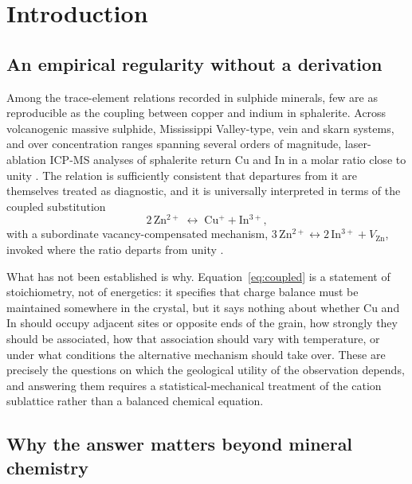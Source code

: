 \documentclass[11pt,a4paper]{article}
\begin{document}
\section{Introduction}

\subsection{An empirical regularity without a derivation}

Among the trace-element relations recorded in sulphide minerals, few are as
reproducible as the coupling between copper and indium in sphalerite. Across
volcanogenic massive sulphide, Mississippi Valley-type, vein and skarn systems,
and over concentration ranges spanning several orders of magnitude,
laser-ablation ICP-MS analyses of sphalerite return Cu and In in a molar ratio
close to unity \citep{cook2009,frenzel2016}. The relation is sufficiently
consistent that
departures from it are themselves treated as diagnostic, and it is universally
interpreted in terms of the coupled substitution
\begin{equation}
2\,\mathrm{Zn^{2+}} \;\longleftrightarrow\; \mathrm{Cu^{+}} + \mathrm{In^{3+}},
\label{eq:coupled}
\end{equation}
with a subordinate vacancy-compensated mechanism,
$3\,\mathrm{Zn^{2+}} \leftrightarrow 2\,\mathrm{In^{3+}} + V_{\mathrm{Zn}}$,
invoked where the ratio departs from unity
\citep{johan1988,belissont2014}.

What has not been established is why. Equation~\eqref{eq:coupled} is a statement
of stoichiometry, not of energetics: it specifies that charge balance must be
maintained somewhere in the crystal, but it says nothing about whether Cu and In
should occupy adjacent sites or opposite ends of the grain, how strongly they
should be associated, how that association should vary with temperature, or
under what conditions the alternative mechanism should take over. These are
precisely the questions on which the geological utility of the observation
depends, and answering them requires a statistical-mechanical treatment of the
cation sublattice rather than a balanced chemical equation.

\subsection{Why the answer matters beyond mineral chemistry}
\end{document}
